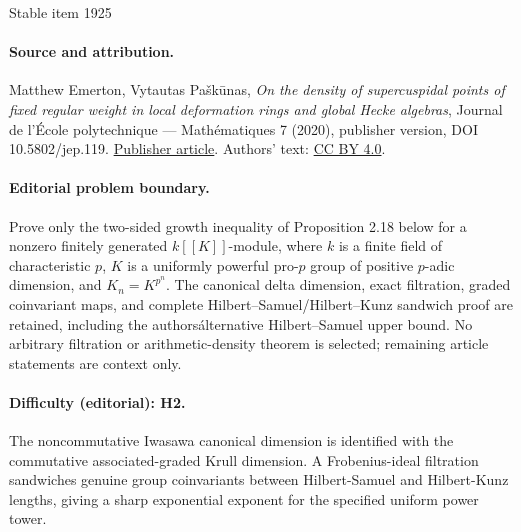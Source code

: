 \documentclass[11pt]{article}
\begin{document}
\begin{center}{\Large Stable item 1925}\end{center}
\paragraph{Source and attribution.}
Matthew Emerton, Vytautas Paškūnas, \emph{On the density of supercuspidal points of fixed regular weight in local deformation rings and global Hecke algebras}, Journal de l’École polytechnique — Mathématiques 7 (2020), publisher version, DOI 10.5802/jep.119. \href{https://jep.centre-mersenne.org/articles/10.5802/jep.119/}{Publisher article}. Authors' text: \href{https://creativecommons.org/licenses/by/4.0/}{CC BY 4.0}.
\paragraph{Editorial problem boundary.}
Prove only the two-sided growth inequality of Proposition 2.18 below for a nonzero finitely generated \(k[[K]]\)-module, where \(k\) is a finite field of characteristic \(p\), \(K\) is a uniformly powerful pro-\(p\) group of positive \(p\)-adic dimension, and \(K_n=K^{p^n}\). The canonical delta dimension, exact filtration, graded coinvariant maps, and complete Hilbert--Samuel/Hilbert--Kunz sandwich proof are retained, including the authors\' alternative Hilbert--Samuel upper bound. No arbitrary filtration or arithmetic-density theorem is selected; remaining article statements are context only.
\paragraph{Difficulty (editorial): H2.}
The noncommutative Iwasawa canonical dimension is identified with the commutative associated-graded Krull dimension. A Frobenius-ideal filtration sandwiches genuine group coinvariants between Hilbert-Samuel and Hilbert-Kunz lengths, giving a sharp exponential exponent for the specified uniform power tower.
\end{document}
